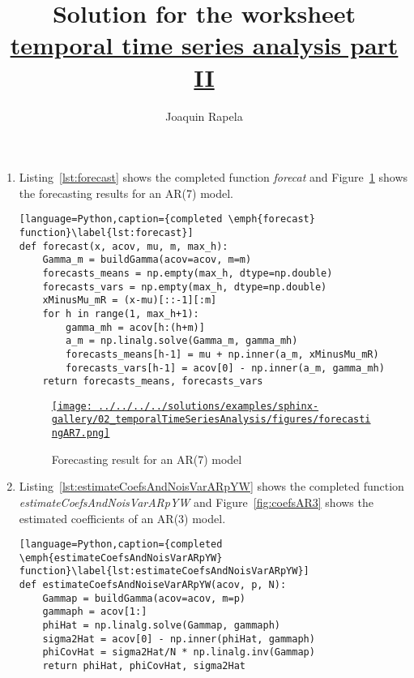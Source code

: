 \documentclass[12pt]{article}
\title{Solution for the worksheet\\
\href{https://github.com/joacorapela/statNeuro2025/blob/master/worksheets/02_temporalTimeSeriesAnalysis/worksheet_temporalTimeSeriesAnalysis2.pdf}{temporal
time series analysis part II}}
\author{Joaquin Rapela}
\begin{document}
\maketitle

\begin{enumerate}

    \item Listing~\ref{lst:forecast} shows the completed function
        \emph{forecat} and Figure~\ref{fig:forecastAR7} shows the forecasting
        results for an AR(7) model.

        \begin{lstlisting}[language=Python,caption={completed \emph{forecast} function}\label{lst:forecast}]
def forecast(x, acov, mu, m, max_h):
    Gamma_m = buildGamma(acov=acov, m=m)
   	forecasts_means = np.empty(max_h, dtype=np.double)
    forecasts_vars = np.empty(max_h, dtype=np.double)
    xMinusMu_mR = (x-mu)[::-1][:m]
    for h in range(1, max_h+1):
       	gamma_mh = acov[h:(h+m)]
        a_m = np.linalg.solve(Gamma_m, gamma_mh)
        forecasts_means[h-1] = mu + np.inner(a_m, xMinusMu_mR)
        forecasts_vars[h-1] = acov[0] - np.inner(a_m, gamma_mh)
    return forecasts_means, forecasts_vars
        \end{lstlisting}

        \begin{figure}
            \begin{center}
                \href{}{\texttt{[image: ../../../../solutions/examples/sphinx-gallery/02\_temporalTimeSeriesAnalysis/figures/forecastingAR7.png]}}
            \end{center}
            \caption{Forecasting result for an AR(7) model}
            \label{fig:forecastAR7}
        \end{figure}

    \item Listing~\ref{lst:estimateCoefsAndNoisVarARpYW} shows the completed
        function \emph{estimateCoefsAndNoisVarARpYW} and
        Figure~\ref{fig:coefsAR3} shows the estimated coefficients of an AR(3)
        model.

        \begin{lstlisting}[language=Python,caption={completed \emph{estimateCoefsAndNoisVarARpYW} function}\label{lst:estimateCoefsAndNoisVarARpYW}]
def estimateCoefsAndNoiseVarARpYW(acov, p, N):
    Gammap = buildGamma(acov=acov, m=p)
    gammaph = acov[1:]
    phiHat = np.linalg.solve(Gammap, gammaph)
    sigma2Hat = acov[0] - np.inner(phiHat, gammaph)
    phiCovHat = sigma2Hat/N * np.linalg.inv(Gammap)
    return phiHat, phiCovHat, sigma2Hat 
        \end{lstlisting}


\end{enumerate}
\end{document}
